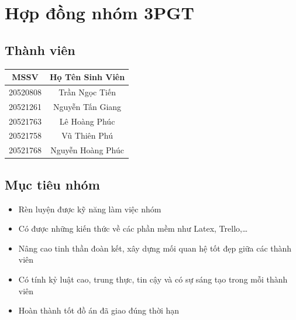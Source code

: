 \documentclass[13pt,a4paper]{article}
\begin{document}
\Large
\tableofcontents
\vspace{1 cm}
\thispagestyle{empty}
\setcounter{page}{0}

\pagebreak

\section {Hợp đồng nhóm 3PGT}
\vspace{0.25cm}
\subsection{Thành viên}
\vspace{1cm}
\begin{tabular}{ |c| c| }
\hline
 MSSV & Họ Tên Sinh Viên  \\ 
\hline
 20520808 & Trần Ngọc Tiến \\  
 \hline
 20521261 & Nguyễn Tấn Giang\\
\hline
 20521763 & Lê Hoàng Phúc \\  
 \hline
 20521758 & Vũ Thiên Phú\\
 \hline
  20521768 & Nguyễn Hoàng Phúc\\
\hline
\end{tabular}
\vspace{0.75cm}
\subsection{Mục tiêu nhóm}
\vspace{0.25cm}
\begin{itemize}
    \item Rèn luyện được kỹ năng làm việc nhóm
    \item Có được những kiến thức về các phần mềm như Latex, Trello,…  
    \item Nâng cao tinh thần đoàn kết, xây dựng mối quan hệ tốt đẹp giữa các thành viên
    \item 	Có tính kỷ luật cao, trung thực, tin cậy và có sự sáng tạo trong mỗi thành viên
    \item	Hoàn thành tốt đồ án đã giao đúng thời hạn
\end{itemize}
\end{document}
